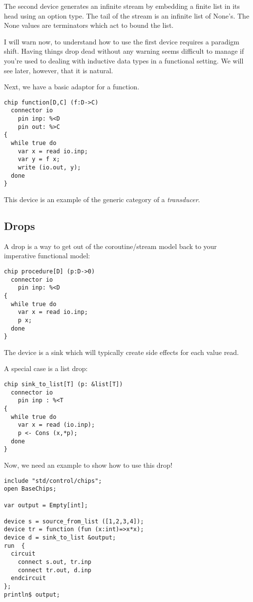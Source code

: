 \documentclass[oneside]{book}
\begin{document}
The second device generates an infinite stream
by embedding a finite list in its head using 
an option type. The tail of the stream is an infinite
list of None's. The None values are terminators which
act to bound the list.

I will warn now, to understand how to use the first device
requires a paradigm shift. Having things drop dead without
any warning seems difficult to manage if you're used
to dealing with inductive data types in a functional
setting. We will see later, however, that it is natural.

Next, we have a basic adaptor for a function.

\begin{verbatim}
chip function[D,C] (f:D->C)
  connector io
    pin inp: %<D
    pin out: %>C
{
  while true do
    var x = read io.inp;
    var y = f x; 
    write (io.out, y);
  done
}
\end{verbatim}


This device is an example of the generic category 
of a {\em transducer}. 

\subsection{Drops}
A drop is a way to get out of the coroutine/stream model
back to your imperative functional model:

\begin{verbatim}
chip procedure[D] (p:D->0)
  connector io
    pin inp: %<D
{
  while true do 
    var x = read io.inp;
    p x;
  done
}
\end{verbatim}

The device is a sink which will typically
create side effects for each value read.

A special case is a list drop:

\begin{verbatim}
chip sink_to_list[T] (p: &list[T])
  connector io
    pin inp : %<T
{
  while true do
    var x = read (io.inp);
    p <- Cons (x,*p);
  done
}
\end{verbatim}

Now, we need an example to show how to use this drop!

\begin{verbatim}
include "std/control/chips";
open BaseChips;

var output = Empty[int];

device s = source_from_list ([1,2,3,4]);
device tr = function (fun (x:int)=>x*x);
device d = sink_to_list &output;
run  { 
  circuit
    connect s.out, tr.inp
    connect tr.out, d.inp
  endcircuit
};
println$ output;
\end{verbatim}
 
\end{document}
